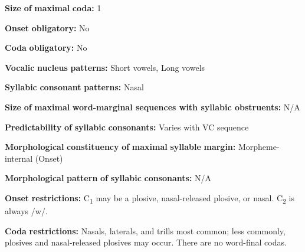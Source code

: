\documentclass[output=paper]{langsci/langscibook}
\begin{document}
\begin{styleBody}
\textbf{Size} \textbf{of} \textbf{maximal} \textbf{coda:} 1
\end{styleBody}

\begin{styleBody}
\textbf{Onset} \textbf{obligatory:} No
\end{styleBody}

\begin{styleBody}
\textbf{Coda} \textbf{obligatory:} No
\end{styleBody}

\begin{styleBody}
\textbf{Vocalic} \textbf{nucleus} \textbf{patterns:} Short vowels, Long vowels
\end{styleBody}

\begin{styleBody}
\textbf{Syllabic} \textbf{consonant} \textbf{patterns:} Nasal
\end{styleBody}

\begin{styleBody}
\textbf{Size} \textbf{of} \textbf{maximal} \textbf{word{}-marginal sequences with syllabic obstruents:} N/A
\end{styleBody}

\begin{styleBody}
\textbf{Predictability} \textbf{of} \textbf{syllabic} \textbf{consonants:} Varies with VC sequence
\end{styleBody}

\begin{styleBody}
\textbf{Morphological} \textbf{constituency} \textbf{of} \textbf{maximal} \textbf{syllable} \textbf{margin:} Morpheme-internal (Onset)
\end{styleBody}

\begin{styleBody}
\textbf{Morphological} \textbf{pattern} \textbf{of} \textbf{syllabic} \textbf{consonants:} N/A
\end{styleBody}

\begin{styleBody}
\textbf{Onset} \textbf{restrictions:} C\textsubscript{1} may be a plosive, nasal-released plosive, or nasal. C\textsubscript{2} is always /w/.
\end{styleBody}

\begin{styleBody}
\textbf{Coda} \textbf{restrictions:} Nasals, laterals, and trills most common; less commonly, plosives and nasal-released plosives may occur. There are no word-final codas.
\end{styleBody}
\end{document}
